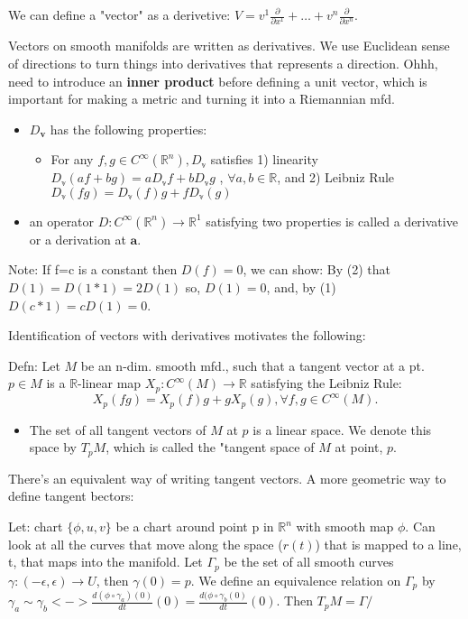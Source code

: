 \documentclass[12pt,letterpaper]{article}
\begin{document}
We can define a "vector" as a derivetive: $V=v^1 \frac{\partial}{\partial x^1} + \dots + v^n \frac{\partial}{\partial x^n}$.

Vectors on smooth manifolds are written as derivatives. We use Euclidean sense of directions to turn things into derivatives that represents a direction. Ohhh, need to introduce an \textbf{inner product} before defining a unit vector, which is important for making a metric and turning it into a Riemannian mfd. 

\begin{itemize}
    \item $D_{\mathbf{v}}$ has the following properties:
    \begin{itemize}
        \item For any $f, g \in C^{\infty} (\mathbb{R}^n), D_{\mathbb{v}}$ satisfies 1) linearity $D_{\mathbb{v}}(af + bg) = aD_{\mathbb{v}}f + bD_{\mathbb{v}}g$ , $\forall a,b \in \mathbb{R}$, and 2) Leibniz Rule $D_{\mathbb{v}}(fg) = D_{\mathbb{v}}(f)g + f D_{\mathbb{v}}(g)$
    \end{itemize}
    \item an operator $D: C^{\infty}(\mathbb{R}^n) \rightarrow \mathbb{R}^1$ satisfying two properties is called a derivative or a derivation at $\mathbf{a}$.
\end{itemize}

Note: If f=c is a constant then $D(f)=0$, we can show: By (2) that $D(1)=D(1*1) = 2D(1)$ so, $D(1)=0$, and, by (1) $D(c*1) = cD(1) = 0$.

Identification of vectors with derivatives motivates the following:

Defn: Let $M$ be an n-dim. smooth mfd., such that a tangent vector at a pt. $p \in M$ is a $\mathbb{R}$-linear map $X_p: C^{\infty}(M) \rightarrow \mathbb{R}$ satisfying the Leibniz Rule:
\begin{equation}
    X_p(fg) = X_p(f)g + gX_p(g), \forall f, g \in C^{\infty}(M).
\end{equation}

\begin{itemize}
    \item The set of all tangent vectors of $M$ at $p$ is a linear space. We denote this space by $T_pM$, which is called the "tangent space of $M$ at point, $p$.
\end{itemize}

There's an equivalent way of writing tangent vectors. A more geometric way to define tangent bectors:

Let: chart $\{ \phi, u, v \}$ be a chart around point p in $\mathbb{R}^n$ with smooth map $\phi$. Can look at all the curves that move along the space ($r(t)$)  that is mapped to a line, t, that maps into the manifold. Let $\Gamma_p$ be the set of all smooth curves $\gamma: (-\epsilon, \epsilon) \rightarrow U$, then $\gamma(0)=p$. We define an equivalence relation on $\Gamma_p$ by $\gamma_a \sim \gamma_b <-> \frac{d(\phi \circ \gamma_a)(0)}{dt}(0) = \frac{d(\phi \circ \gamma_b(0)}{dt}(0)$. Then $T_pM = \Gamma/~$
 
\end{document}
